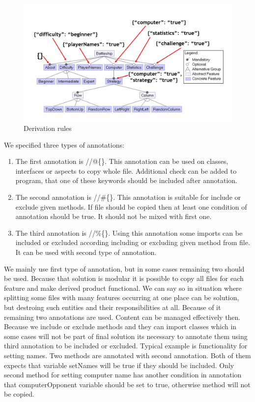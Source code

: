 \documentclass[11pt,slovak,a4paper,twoside]{article}
\begin{document}
\begin{figure}[H]  %
					\begin{center}
									\includegraphics[width=\linewidth]{fig/derivationRules.png}
									\caption{Derivation rules}
									\label{derivationRules}
					\end{center}
\end{figure}


We specified three types of annotations:

\begin{enumerate}
	\item The first annotation is //@\{\}. This annotation can be used on classes, interfaces or aspects to copy whole file. Additional check can be added to program, that one of these keywords should be included after annotation.

	\item The second annotation is //\#\{\}. This annotation is suitable for include or exclude given methods. If file should be copied then at least one condition of annotation should be true. It should not be mixed with first one. 

	\item The third annotation is //\%\{\}. Using this annotation some imports can be included or excluded according including or excluding given method from file. It can be used with second type of annotation. 
\end{enumerate}

We mainly use first type of annotation, but in some cases remaining two should be used. Because that solution is modular it is possible to copy all files for each feature and make derived product functional. We can say so in situation where splitting some files with many features occurring at one place can be solution, but destroing such entities and their responsibilities at all. Because of it remaining two annotations are used. Content can be managed effectively then. Because we include or exclude methods and they can import classes which in some cases will not be part of final solution its necessary to annotate them using third annotation to be included or excluded. Typical example is functionality for setting names. Two methods are annotated with second annotation. Both of them expects that variable setNames will be true if they should be included. Only second method for setting computer name has another condition in annotation that computerOpponent variable should be set to true, otherwise method will not be copied. 
 
\end{document}
